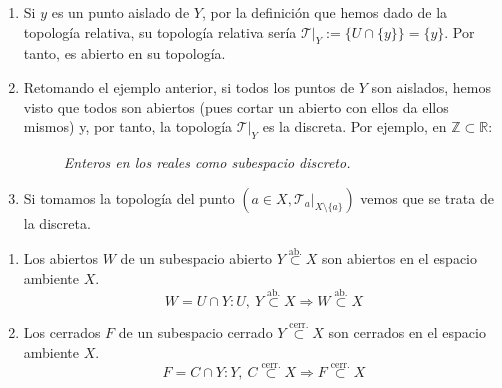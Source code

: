 \begin{ej}
\begin{enumerate}
    \item Si $y$ es un punto aislado de $Y$, por la definición que hemos dado de la topología relativa, su topología relativa sería $\mathcal{T}|_Y := \{ U \cap \{y\} \} = \{y\}$. Por tanto, es abierto en su topología.
    
    \item Retomando el ejemplo anterior, si todos los puntos de $Y$ son aislados, hemos visto que todos son abiertos (pues cortar un abierto con ellos da ellos mismos) y, por tanto, la topología $\mathcal{T}|_Y $ es la discreta. Por ejemplo, en $\mathbb{Z} \subset \mathbb{R}$:
\begin{figure}[H]
    \centering
    \caption{\textit{Enteros en los reales como subespacio discreto.}}
    \label{fig:enteros-en-los-reales-como-subespacio-discreto.}
\end{figure}

    \item Si tomamos la topología del punto $(a \in X, \mathcal{T}_a|_{X \setminus \{a\}})$ vemos que se trata de la discreta.
\end{enumerate}
\end{ej}

\begin{obs}
\begin{enumerate}
    \item Los abiertos $W$ de un subespacio abierto $Y \stackrel{\text{ab.}}{\subset} X$ son abiertos en el espacio ambiente $X$.
   	$$
    W = U \cap Y : U,\ Y\stackrel{\text{ab.}}{\subset} X \Rightarrow W \stackrel{\text{ab.}}{\subset} X 
    $$
    \item Los cerrados $F$ de un subespacio cerrado $Y \stackrel{\text{cerr.}}{\subset} X$ son cerrados en el espacio ambiente $X$.
    $$
    F = C \cap Y : Y,\ C\stackrel{\text{cerr.}}{\subset} X \Rightarrow F \stackrel{\text{cerr.}}{\subset} X
    $$
\end{enumerate}
\end{obs}

